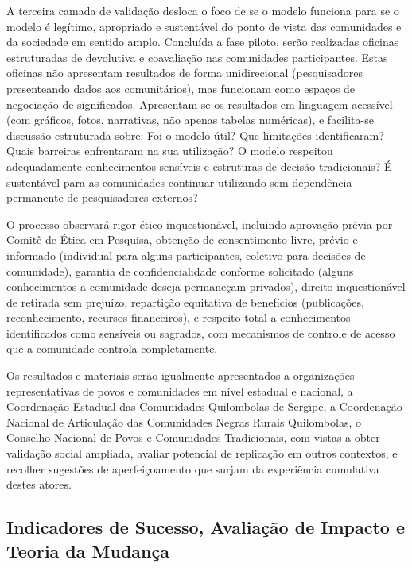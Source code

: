 A terceira camada de validação desloca o foco de se o modelo funciona para se o modelo é legítimo, apropriado e sustentável do ponto de vista das comunidades e da sociedade em sentido amplo. Concluída a fase piloto, serão realizadas oficinas estruturadas de devolutiva e coavaliação nas comunidades participantes. Estas oficinas não apresentam resultados de forma unidirecional (pesquisadores presenteando dados aos comunitários), mas funcionam como espaços de negociação de significados. Apresentam-se os resultados em linguagem acessível (com gráficos, fotos, narrativas, não apenas tabelas numéricas), e facilita-se discussão estruturada sobre: Foi o modelo útil? Que limitações identificaram? Quais barreiras enfrentaram na sua utilização? O modelo respeitou adequadamente conhecimentos sensíveis e estruturas de decisão tradicionais? É sustentável para as comunidades continuar utilizando sem dependência permanente de pesquisadores externos?

O processo observará rigor ético inquestionável, incluindo aprovação prévia por Comitê de Ética em Pesquisa, obtenção de consentimento livre, prévio e informado (individual para alguns participantes, coletivo para decisões de comunidade), garantia de confidencialidade conforme solicitado (alguns conhecimentos a comunidade deseja permaneçam privados), direito inquestionável de retirada sem prejuízo, repartição equitativa de benefícios (publicações, reconhecimento, recursos financeiros), e respeito total a conhecimentos identificados como sensíveis ou sagrados, com mecanismos de controle de acesso que a comunidade controla completamente.

Os resultados e materiais serão igualmente apresentados a organizações representativas de povos e comunidades em nível estadual e nacional, a Coordenação Estadual das Comunidades Quilombolas de Sergipe, a Coordenação Nacional de Articulação das Comunidades Negras Rurais Quilombolas, o Conselho Nacional de Povos e Comunidades Tradicionais, com vistas a obter validação social ampliada, avaliar potencial de replicação em outros contextos, e recolher sugestões de aperfeiçoamento que surjam da experiência cumulativa destes atores.

\subsection{Indicadores de Sucesso, Avaliação de Impacto e Teoria da Mudança}

